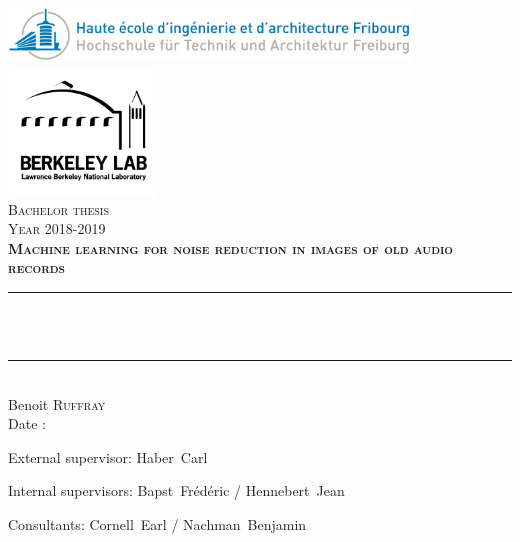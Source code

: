 \begin{titlepage}

\newcommand{\HRule}{\rule{\linewidth}{0.5mm}} %

\center %


\includegraphics[width=0.8\textwidth]{logo_HEIA.jpg}
\includegraphics[width=0.3\textwidth]{logo_LBNL.png}\\[1.1cm]
\textsc{\Large Bachelor thesis \\ [0.3cm]
\large Year 2018-2019 }\\ [2.0cm]


\textsc{
\bfseries \LARGE Machine learning for noise reduction in images of old audio records}\\ [1.0cm]


\HRule \\[0.5cm]
{ \huge \bfseries \Title }\\ 
\HRule \\[1.2cm]

\Large
Benoit \textsc{Ruffray}\\[1.0cm] 

{\large Date : \daterendu}\\[1.3cm] 

\begin{flushleft}
\large External supervisor: Haber~Carl
\end{flushleft}
\begin{flushleft}
	\large Internal supervisors: Bapst~Frédéric / Hennebert~Jean
\end{flushleft}
\begin{flushleft}
\large Consultants: Cornell~Earl / Nachman~Benjamin
\end{flushleft}

\end{titlepage}